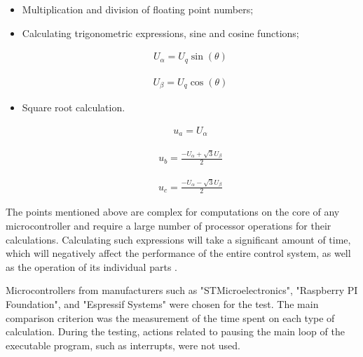 \begin{itemize}
	\item Multiplication and division of floating point numbers;
	\item Calculating trigonometric expressions, sine and cosine functions;

	      \begin{ceqn}
		      \begin{align} \label{u_park}
			      U_\alpha = U_q \sin(\theta)
		      \end{align}
	      \end{ceqn}


	      \begin{ceqn}
		      \begin{align} \label{u_park2}
			      U_\beta = U_q \cos(\theta)
		      \end{align}
	      \end{ceqn}
	\item Square root calculation.
	      \begin{ceqn}
		      \begin{align} \label{U_a}
			      u_a = U_\alpha
		      \end{align}
	      \end{ceqn}

	      \begin{ceqn}
		      \begin{align} \label{u_b}
			      u_b = \frac{-U_\alpha + \sqrt{3}U_\beta}{2}
		      \end{align}
	      \end{ceqn}

	      \begin{ceqn}
		      \begin{align} \label{u_c}
			      u_c = \frac{-U_\alpha - \sqrt{3}U_\beta}{2}
		      \end{align}
	      \end{ceqn}

\end{itemize}



The points mentioned above are complex for computations on the core of any microcontroller and require a large number of processor operations for their calculations. Calculating such expressions will take a significant amount of time, which will negatively affect the performance of the entire control system, as well as the operation of its individual parts \citep{pack2008microcontroller}.

Microcontrollers from manufacturers such as "STMicroelectronics", "Raspberry PI Foundation", and "Espressif Systems" were chosen for the test. The main comparison criterion was the measurement of the time spent on each type of calculation. During the testing, actions related to pausing the main loop of the executable program, such as interrupts, were not used.

